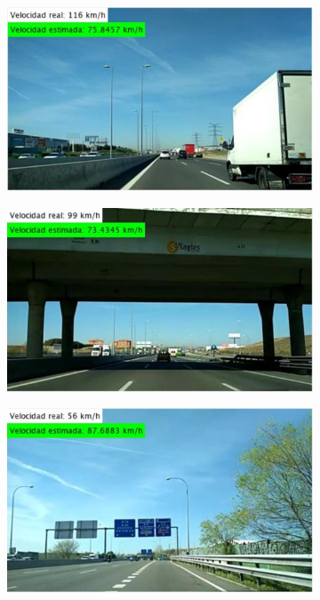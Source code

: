 \begin{figure}[H]
\centering
  \begin{subfigure}[b]{0.45\linewidth}
    \includegraphics[width=\linewidth]{Figuras/Resultado_SVR_Autovia_MAL_1.eps}
  \end{subfigure}
  \begin{subfigure}[b]{0.45\linewidth}
    \includegraphics[width=\linewidth]{Figuras/Resultado_SVR_Autovia_MAL_2.eps}
  \end{subfigure}
  \begin{subfigure}[b]{0.45\linewidth}
    \includegraphics[width=\linewidth]{Figuras/Resultado_SVR_Autovia_MAL_3.eps}

\end{subfigure}
\end{figure}
